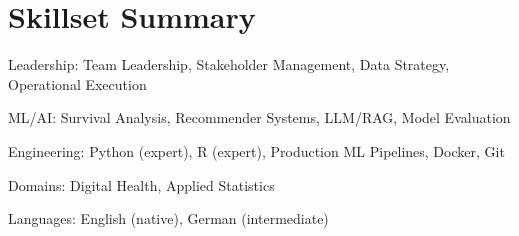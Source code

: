\section{Skillset Summary}
\begin{itemize*}
 \item Leadership: Team Leadership, Stakeholder Management, Data Strategy, Operational Execution
 \item ML/AI: Survival Analysis, Recommender Systems, LLM/RAG, Model Evaluation
 \item Engineering: Python (expert), R (expert), Production ML Pipelines, Docker, Git
 \item Domains: Digital Health, Applied Statistics
 \item Languages: English (native), German (intermediate)
\end{itemize*}
